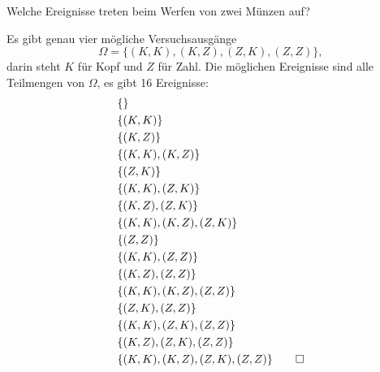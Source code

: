 Welche Ereignisse treten beim Werfen von zwei Münzen auf?


\begin{loesung}
Es gibt genau vier mögliche Versuchsausgänge
\[
\Omega=\{
(K,K),
(K,Z),
(Z,K),
(Z,Z)\},
\]
darin steht  $K$ für Kopf und $Z$ für Zahl.
Die möglichen Ereignisse sind alle Teilmengen von $\Omega$, es
gibt 16 Ereignisse:
\begin{align*}
&\{                           \}\\
&\{(K,K)                      \}\\
&\{       (K,Z)               \}\\
&\{(K,K), (K,Z)               \}\\
&\{              (Z,K)        \}\\
&\{(K,K),        (Z,K)        \}\\
&\{       (K,Z), (Z,K)        \}\\
&\{(K,K), (K,Z), (Z,K)        \}\\
&\{                     (Z,Z) \}\\
&\{(K,K),               (Z,Z) \}\\
&\{       (K,Z),        (Z,Z) \}\\
&\{(K,K), (K,Z),        (Z,Z) \}\\
&\{              (Z,K), (Z,Z) \}\\
&\{(K,K),        (Z,K), (Z,Z) \}\\
&\{       (K,Z), (Z,K), (Z,Z) \}\\
&\{(K,K), (K,Z), (Z,K), (Z,Z) \}
\qedhere
\end{align*}
\end{loesung}

